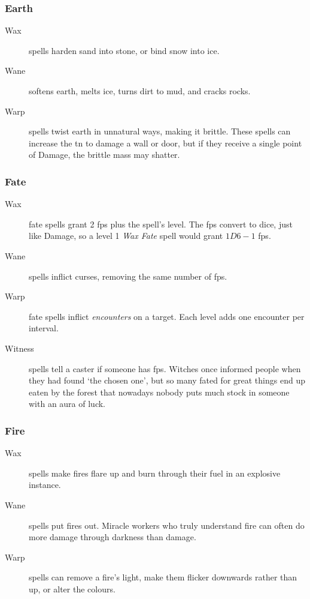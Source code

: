 \begin{multicols}{2}
\subsubsection{Earth}

\begin{description}
  \item[Wax]
  spells harden sand into stone, or bind snow into ice.
  \item[Wane]
  softens earth, melts ice, turns dirt to mud, and cracks rocks.
  \item[Warp]
  spells twist earth in unnatural ways, making it brittle.
  These spells can increase the \gls{tn} to damage a wall or door, but if they receive a single point of Damage, the brittle mass may shatter.
\end{description}

\subsubsection{Fate}

\begin{description}
  \item[Wax]
  fate spells grant 2 \glspl{fp} plus the spell's level.
  The \glspl{fp} convert to dice, just like Damage, so a level 1 \textit{Wax Fate} spell would grant $1D6-1$ \glspl{fp}.
  \item[Wane]
  spells inflict curses, removing the same number of \glspl{fp}.
  \item[Warp]
  fate spells inflict \emph{encounters} on a target.
  Each level adds one encounter per interval.%
  \iftoggle{judgement}{%
    \footnote{\Glspl{gm} looking for encounter ideas can find a system in \textit{Judgement}: \nameref{encounters}, \autopageref{encounters}.}%
  }{}
  \item[Witness]
  spells tell a caster if someone has \glspl{fp}.
  Witches once informed people when they had found `the chosen one', but so many fated for great things end up eaten by the forest that nowadays nobody puts much stock in someone with an aura of luck.
\end{description}

\subsubsection{Fire}

\begin{description}
  \item[Wax]
  spells make fires flare up and burn through their fuel in an explosive instance.
  \item[Wane]
  spells put fires out.
  Miracle workers who truly understand fire can often do more damage through darkness than damage.
  \item[Warp]
  spells can remove a fire's light, make them flicker downwards rather than up, or alter the colours.
\end{description}


\end{multicols}
